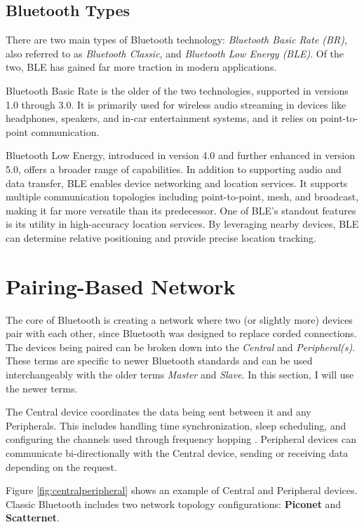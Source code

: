 \subsection{Bluetooth Types}

There are two main types of Bluetooth technology: \textit{Bluetooth Basic Rate (BR)}, also referred to as \textit{Bluetooth Classic}, and \textit{Bluetooth Low Energy (BLE)}. Of the two, BLE has gained far more traction in modern applications.

Bluetooth Basic Rate is the older of the two technologies, supported in versions 1.0 through 3.0. It is primarily used for wireless audio streaming in devices like headphones, speakers, and in-car entertainment systems, and it relies on point-to-point communication.

Bluetooth Low Energy, introduced in version 4.0 and further enhanced in version 5.0, offers a broader range of capabilities. In addition to supporting audio and data transfer, BLE enables device networking and location services. It supports multiple communication topologies including point-to-point, mesh, and broadcast, making it far more versatile than its predecessor. One of BLE’s standout features is its utility in high-accuracy location services. By leveraging nearby devices, BLE can determine relative positioning and provide precise location tracking.

\section{Pairing-Based Network}

The core of Bluetooth is creating a network where two (or slightly more) devices pair with each other, since Bluetooth was designed to replace corded connections. The devices being paired can be broken down into the \textit{Central} and \textit{Peripheral(s)}. These terms are specific to newer Bluetooth standards and can be used interchangeably with the older terms \textit{Master} and \textit{Slave}. In this section, I will use the newer terms.

The Central device coordinates the data being sent between it and any Peripherals. This includes handling time synchronization, sleep scheduling, and configuring the channels used through frequency hopping \cite{nextgenBLE}. Peripheral devices can communicate bi-directionally with the Central device, sending or receiving data depending on the request.

Figure \ref{fig:centralperipheral} shows an example of Central and Peripheral devices. Classic Bluetooth includes two network topology configurations: \textbf{Piconet} and \textbf{Scatternet}.

